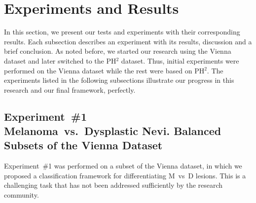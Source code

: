 
\section{Experiments and Results}
\label{sec:chp3-sec5}

In this section, we present our tests and experiments with their corresponding results. 
Each subsection describes an experiment with its results, discussion and a brief conclusion. 
As noted before, we started our research using the Vienna dataset and later switched to the PH$^{2}$ dataset. 
Thus, initial experiments were performed on the Vienna dataset while the rest were based on PH$^{2}$. 
The experiments listed in the following subsections illustrate our progress in this research and our final framework, perfectly.

\subsection{Experiment~\#1\\
\small{Melanoma~vs.~Dysplastic Nevi. Balanced Subsets of the Vienna Dataset}}

Experiment~\#1 was performed on a subset of the Vienna dataset, in which we proposed a classification framework for differentiating M~vs~D lesions.
This is a challenging task that has not been addressed sufficiently by the research community.

